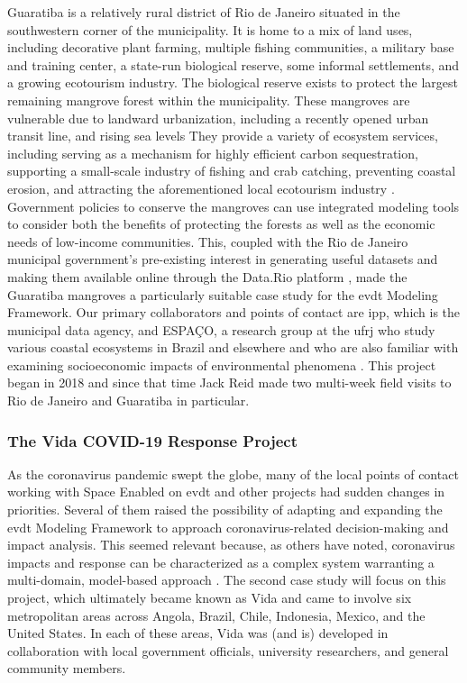 \documentclass[notitlepage]{article}
\begin{document}
Guaratiba is a relatively rural district of Rio de Janeiro situated in the southwestern corner of the municipality. It is home to a mix of land uses, including decorative plant farming, multiple fishing communities, a military base and training center, a state-run biological reserve, some informal settlements, and a growing ecotourism industry. The biological reserve exists to protect the largest remaining mangrove forest within the municipality. These mangroves are vulnerable due to landward urbanization, including a recently opened urban transit line, and rising sea levels \cite{goldbergEcoMapDecisionsupportTool2018} They provide a variety of ecosystem services, including serving as a mechanism for highly efficient carbon sequestration, supporting a small-scale industry of fishing and crab catching, preventing coastal erosion, and attracting the aforementioned local ecotourism industry \cite{schwenkResearchEnvironmentalSocioeconomical2008}. Government policies to conserve the mangroves can use integrated modeling tools to consider both the benefits of protecting the forests as well as the economic needs of low-income communities. This, coupled with the Rio de Janeiro municipal government's pre-existing interest in generating useful datasets and making them available online through the Data.Rio platform \cite{matheusOpenGovernmentData2014}, made the Guaratiba mangroves a particularly suitable case study for the \ac{evdt} Modeling Framework. Our primary collaborators and points of contact are \ac{ipp}, which is the municipal data agency, and ESPAÇO, a research group at the \ac{ufrj} who study various coastal ecosystems in Brazil and elsewhere \cite{cruzClassificacaoOrientadaObjetos2007, seabraMapeamentoDinamicaCobertura2013} and who are also familiar with examining socioeconomic impacts of environmental phenomena \cite{schwenkResearchEnvironmentalSocioeconomical2008}. This project began in 2018 and since that time Jack Reid made two multi-week field visits to Rio de Janeiro and Guaratiba in particular.


\subsubsection{The Vida COVID-19 Response Project}

As the coronavirus pandemic swept the globe, many of the local points of contact working with Space Enabled on \ac{evdt} and other projects had sudden changes in priorities. Several of them raised the possibility of adapting and expanding the \ac{evdt} Modeling Framework to approach coronavirus-related decision-making and impact analysis. This seemed relevant because, as others have noted, coronavirus impacts and response can be characterized as a complex system warranting a multi-domain, model-based approach \cite{deweckHandlingCOVID192020}. The second case study will focus on this project, which ultimately became known as Vida and came to involve six metropolitan areas across Angola, Brazil, Chile, Indonesia, Mexico, and the United States. In each of these areas, Vida was (and is) developed in collaboration with local government officials, university researchers, and general community members. 
\end{document}
